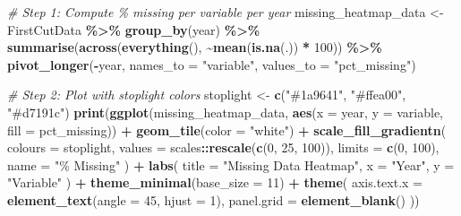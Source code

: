 \documentclass[
]{article}
\newenvironment{Shaded}{\begin{snugshade}}{\end{snugshade}}
\newcommand{\AttributeTok}[1]{\textcolor[rgb]{0.13,0.29,0.53}{#1}}
\newcommand{\CommentTok}[1]{\textcolor[rgb]{0.56,0.35,0.01}{\textit{#1}}}
\newcommand{\DecValTok}[1]{\textcolor[rgb]{0.00,0.00,0.81}{#1}}
\newcommand{\FunctionTok}[1]{\textcolor[rgb]{0.13,0.29,0.53}{\textbf{#1}}}
\newcommand{\NormalTok}[1]{#1}
\newcommand{\OtherTok}[1]{\textcolor[rgb]{0.56,0.35,0.01}{#1}}
\newcommand{\SpecialCharTok}[1]{\textcolor[rgb]{0.81,0.36,0.00}{\textbf{#1}}}
\newcommand{\StringTok}[1]{\textcolor[rgb]{0.31,0.60,0.02}{#1}}
\begin{document}
\begin{Shaded}
\begin{Highlighting}[]
\CommentTok{\# Step 1: Compute \% missing per variable per year}
\NormalTok{missing\_heatmap\_data }\OtherTok{\textless{}{-}}\NormalTok{ FirstCutData }\SpecialCharTok{\%\textgreater{}\%}
  \FunctionTok{group\_by}\NormalTok{(year) }\SpecialCharTok{\%\textgreater{}\%}
  \FunctionTok{summarise}\NormalTok{(}\FunctionTok{across}\NormalTok{(}\FunctionTok{everything}\NormalTok{(), }\SpecialCharTok{\textasciitilde{}}\FunctionTok{mean}\NormalTok{(}\FunctionTok{is.na}\NormalTok{(.)) }\SpecialCharTok{*} \DecValTok{100}\NormalTok{)) }\SpecialCharTok{\%\textgreater{}\%}
  \FunctionTok{pivot\_longer}\NormalTok{(}\SpecialCharTok{{-}}\NormalTok{year, }\AttributeTok{names\_to =} \StringTok{"variable"}\NormalTok{, }\AttributeTok{values\_to =} \StringTok{"pct\_missing"}\NormalTok{)}

\CommentTok{\# Step 2: Plot with stoplight colors}
\NormalTok{stoplight }\OtherTok{\textless{}{-}} \FunctionTok{c}\NormalTok{(}\StringTok{"\#1a9641"}\NormalTok{, }\StringTok{"\#ffea00"}\NormalTok{, }\StringTok{"\#d7191c"}\NormalTok{)}
\FunctionTok{print}\NormalTok{(}\FunctionTok{ggplot}\NormalTok{(missing\_heatmap\_data, }\FunctionTok{aes}\NormalTok{(}\AttributeTok{x =}\NormalTok{ year, }\AttributeTok{y =}\NormalTok{ variable, }\AttributeTok{fill =}\NormalTok{ pct\_missing)) }\SpecialCharTok{+}
  \FunctionTok{geom\_tile}\NormalTok{(}\AttributeTok{color =} \StringTok{"white"}\NormalTok{) }\SpecialCharTok{+}
  \FunctionTok{scale\_fill\_gradientn}\NormalTok{(}
    \AttributeTok{colours =}\NormalTok{ stoplight,}
    \AttributeTok{values =}\NormalTok{ scales}\SpecialCharTok{::}\FunctionTok{rescale}\NormalTok{(}\FunctionTok{c}\NormalTok{(}\DecValTok{0}\NormalTok{, }\DecValTok{25}\NormalTok{, }\DecValTok{100}\NormalTok{)),}
    \AttributeTok{limits =} \FunctionTok{c}\NormalTok{(}\DecValTok{0}\NormalTok{, }\DecValTok{100}\NormalTok{),}
    \AttributeTok{name =} \StringTok{"\% Missing"}
\NormalTok{  ) }\SpecialCharTok{+}
  \FunctionTok{labs}\NormalTok{(}
    \AttributeTok{title =} \StringTok{"Missing Data Heatmap"}\NormalTok{,}
    \AttributeTok{x =} \StringTok{"Year"}\NormalTok{,}
    \AttributeTok{y =} \StringTok{"Variable"}
\NormalTok{  ) }\SpecialCharTok{+}
  \FunctionTok{theme\_minimal}\NormalTok{(}\AttributeTok{base\_size =} \DecValTok{11}\NormalTok{) }\SpecialCharTok{+}
  \FunctionTok{theme}\NormalTok{(}
    \AttributeTok{axis.text.x =} \FunctionTok{element\_text}\NormalTok{(}\AttributeTok{angle =} \DecValTok{45}\NormalTok{, }\AttributeTok{hjust =} \DecValTok{1}\NormalTok{),}
    \AttributeTok{panel.grid =} \FunctionTok{element\_blank}\NormalTok{()}
\NormalTok{  ))}
\end{Highlighting}
\end{Shaded}
\end{document}
